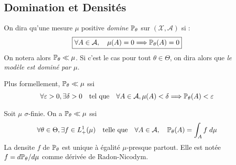 

\subsection{Domination et Densités}

\begin{definition}[Domination]
    On dira qu'une mesure $ \mu$ positive \emph{domine} $ \mathbb{P}_\theta$ sur $( \mathcal{X}, \mathcal{A})$ si : 
    \begin{equation}
        \boxed{
            \forall A \in \mathcal{A}, \quad \mu(A) = 0 \Longrightarrow \mathbb{P}_\theta(A) = 0 
        }
    \end{equation}
    On notera alors $ \mathbb{P}_\theta \ll \mu$.
    Si c'est le cas pour tout $ \theta \in \Theta$, on dira alors que \emph{le modèle est dominé par $ \mu$}.
\end{definition}

Plus formellement, $ \mathbb{P}_\theta \ll \mu$ ssi 
    \begin{equation}
        \forall \varepsilon > 0, \exists \delta > 0 \quad \text{tel que} \quad 
        \forall A \in \mathcal{A}, \mu(A) < \delta \Longrightarrow \mathbb{P}_\theta(A) < \varepsilon 
    \end{equation}

\begin{theorem}
    Soit $ \mu$ $ \sigma$-finie. On a $ \mathbb{P}_\theta \ll \mu$ ssi 
    \begin{equation}
        \forall \theta \in \Theta, \exists f \in L^1_+( \mu) \quad \text{telle que} \quad 
        \forall A \in \mathcal{A}, \quad \mathbb{P}_\theta(A) = \int_A f \; d \mu 
    \end{equation}
    La densite $f$ de $ \mathbb{P}_\theta$ est unique à égalité $ \mu$-presque partout. Elle est notée 
    $f = d \mathbb{P}_\theta / d \mu$ comme dérivée de Radon-Nicodym. 
\end{theorem}


